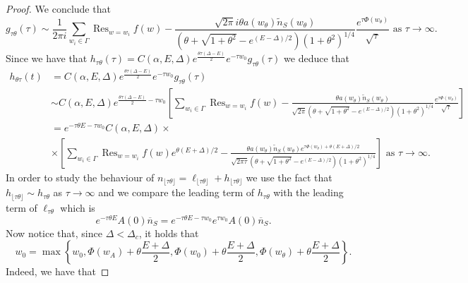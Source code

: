 \documentclass{article}
\numberwithin{equation}{section}
\theoremstyle{plain}
\begin{document}
\begin{proof}
We conclude that 
\[
g_{\tau \theta } (\tau)  \sim \frac{1}{2 \pi i }\sum_{w_i \in \Gamma } \operatorname{Res}_{ w= w_i } f(w)-  \frac{    \sqrt{2\pi} i \theta a(w_\theta ) \tilde{n}_S(w_\theta )}{(\theta+ \sqrt{1+ \theta^2 } - e^{(E-\Delta)/2}) (1+\theta^2)^{1/4}} \frac{ e^{ \tau \Phi(w_\theta ) }}{\sqrt{\tau}} \text{ as } \tau \to \infty. 
\]
Since we have that $h_{\tau \theta } (\tau) =  C(\alpha, E, \Delta) e^{  \frac{\theta \tau (\Delta - E) }{2}} e^{- \tau w_0 } g_{\tau \theta } (\tau) $ we deduce that
\begin{align*}
    h_{\theta \tau } (t)  &=  C(\alpha, E, \Delta) e^{  \frac{\theta \tau (\Delta - E) }{2}} e^{- \tau w_0 }g_{\tau \theta}(\tau) \\
    & \sim  C(\alpha, E, \Delta) e^{ \frac{ \theta \tau (\Delta - E) }{2}  - \tau w_0 } \left[ \sum_{ w_i \in \Gamma } \operatorname{Res}_{w=w_i} f(w)  - \frac{  \theta     a(w_\theta ) \tilde{n}_S(w_\theta )}{\sqrt{2 \pi }(\theta+ \sqrt{1+ \theta^2 } - e^{(E-\Delta)/2}) (1+\theta^2)^{1/4}} \frac{ e^{ \tau \Phi(w_\theta ) }}{\sqrt{\tau}}\right] \\
    &= e^{- \tau \theta E - \tau w_0 }C(\alpha, E, \Delta) \times\\
   & \times \left[ \sum_{ w_i \in \Gamma } \operatorname{Res}_{w=w_i} f(w) e^{\theta (E+\Delta)/2 } - \frac{  \theta     a(w_\theta ) \tilde{n}_S(w_\theta )   
   e^{ \tau \Phi(w_\theta ) + \theta(E+\Delta)/2} 
   }{\sqrt{2 \pi \tau }(\theta+ \sqrt{1+ \theta^2 } - e^{(E-\Delta)/2}) (1+\theta^2)^{1/4}}  \right]\text{ as } \tau \to \infty. 
\end{align*}
In order to study the behaviour of $n_{ \lfloor \tau \theta \rfloor } = \ell_{\lfloor \tau \theta \rfloor } + h_{\lfloor \tau \theta \rfloor} $ we use the fact that $ h_{\lfloor \tau \theta \rfloor} \sim h_{ \tau \theta }$ as $\tau \to \infty$ and we compare  the leading term of $h_{\tau \theta } $ with the leading term of $\ell_{\tau \theta } $ which is 
\begin{equation} \label{leading sub}
e^{- \tau \theta E } A(0) \overline {n}_S =e^{- \tau \theta E - \tau w_0 } e^{ \tau w_0 } A(0) \overline {n}_S .
\end{equation}
Now notice that, since $\Delta < \Delta_c $, it holds that
\begin{equation}\label{comparison 1.a}
w_0= \max\left\{ w_0 , \Phi(w_A) + \theta\frac{E+ \Delta }{2}, \Phi(w_0) + \theta\frac{E+ \Delta }{2}, \Phi(w_\theta) + \theta \frac{E+ \Delta }{2}  \right\}.
\end{equation}
Indeed, we have that 

\end{proof}
\end{document}
